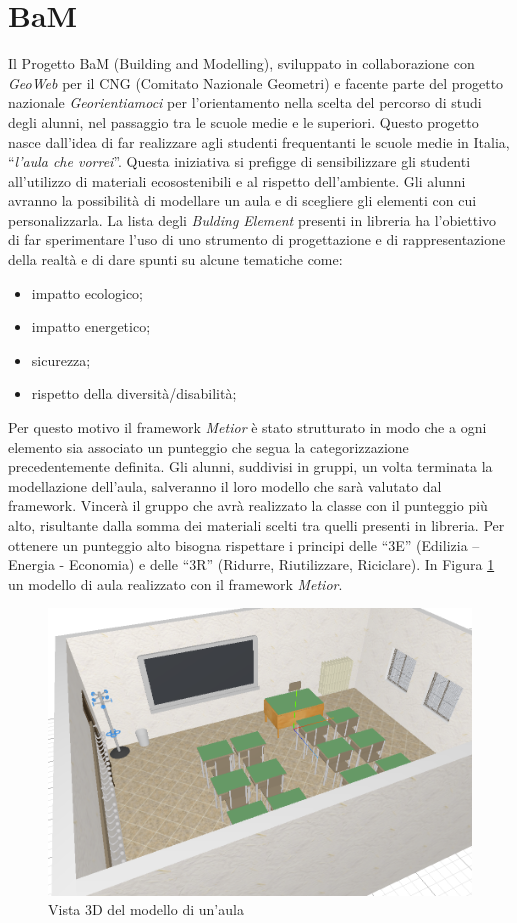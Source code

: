 \section{BaM}
\label{sec:chapter_4_section_1}
Il Progetto BaM (Building and Modelling), sviluppato in collaborazione con \emph{GeoWeb} per il CNG (Comitato Nazionale Geometri)
e facente parte del progetto nazionale \emph{Georientiamoci} per l’orientamento nella scelta
del percorso di studi degli alunni, nel passaggio tra le scuole medie e le superiori.
Questo progetto nasce dall'idea di far realizzare agli studenti frequentanti le scuole medie in Italia,
``\emph{l'aula che vorrei}''. Questa iniziativa si prefigge di sensibilizzare gli studenti all’utilizzo di materiali
ecosostenibili e al rispetto dell’ambiente.
Gli alunni avranno la possibilità di modellare un aula e di scegliere gli elementi con cui personalizzarla.
La lista degli \emph{Bulding Element} presenti in libreria ha l’obiettivo di far sperimentare l’uso di uno strumento di progettazione
e di rappresentazione della realtà e di dare spunti su alcune tematiche come:
\begin{itemize}
\item impatto ecologico;
\item impatto energetico;
\item sicurezza;
\item rispetto della diversità/disabilità;
\end{itemize}
Per questo motivo il framework \emph{Metior} è stato strutturato in modo che a ogni elemento sia associato un punteggio che segua
la categorizzazione precedentemente definita.
Gli alunni, suddivisi in gruppi, un volta terminata la modellazione dell'aula, salveranno il loro modello che sarà valutato
dal framework.
Vincerà il gruppo che avrà realizzato la classe con il punteggio più alto, risultante dalla somma dei materiali scelti
tra quelli presenti in libreria. Per ottenere un punteggio alto bisogna rispettare i principi delle
“3E” (Edilizia – Energia - Economia) e delle “3R” (Ridurre, Riutilizzare, Riciclare). In Figura \ref{fig:3daula}
un modello di aula realizzato con il framework \emph{Metior}.\\
\begin{figure}[htbp] %
   \centering
   \includegraphics[width=0.6\linewidth]{images/3d-school-2}
   \caption{Vista 3D del modello di un'aula}
   \label{fig:3daula}
   \end{figure}

